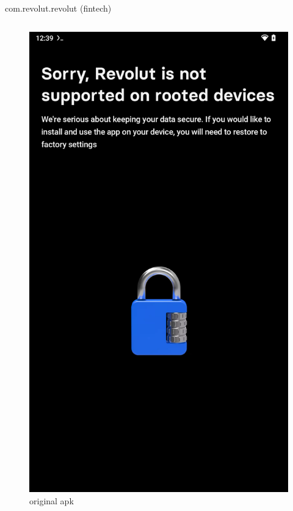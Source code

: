 \documentclass{beamer}
\begin{document}
\begin{frame}[fragile]{com.revolut.revolut (fintech)}
    
    \begin{columns} 
        \begin{figure}
            \centering
            \includegraphics[scale=0.07]{revolut.png}
            \caption{original apk}
            \end{figure}

\end{columns}
\end{frame}
\end{document}

